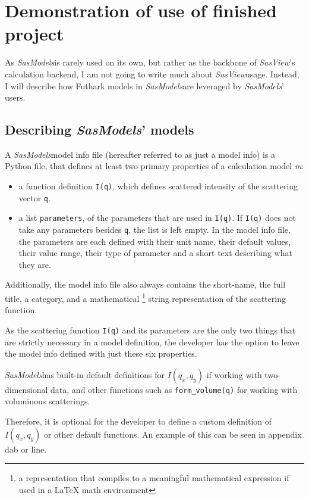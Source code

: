 \documentclass[11pt]{article}
\newcommand{\sasmodels}{\textit{SasModels}}
\newcommand{\sasview}{\textit{SasView}}
\begin{document}
\section{Demonstration of use of finished project}
As \sasmodels is rarely used on its own, but rather as the backbone of 
\sasview's calculation backend, I am not going to write much about 
\sasview usage.
Instead, I will describe how Futhark models in \sasmodels are leveraged 
by \sasmodels' users.


\subsection{Describing \sasmodels' models}
A \sasmodels model info file (hereafter referred to as just a model info) is a 
Python file, that defines at least two primary properties of a 
calculation model \textit{m}:
\begin{itemize}

  \item a function definition \texttt{I(q)}, which defines scattered intensity 
  of the scattering vector \texttt{q}.

  \item a list \texttt{parameters}, of the parameters that are used in 
  \texttt{I(q)}. If \texttt{I(q)} does not take any parameters besides 
  \texttt{q}, the list is left empty.
  In the model info file, the parameters are each defined with their unit name, 
  their default values, their value range, their type of parameter and
  a short text describing what they are.
\end{itemize}

Additionally, the model info file also always contains the short-name, 
the full title, a category, and a mathematical \footnote{a representation 
that compiles to a meaningful mathematical expression if used in a LaTeX math 
environment} string representation of the scattering function.

As the scattering function \texttt{I(q)} and its parameters are the only 
two things that are strictly necessary in a model definition, the developer
has the option to leave the model info defined with just these six properties.

\sasmodels has built-in default definitions for $I(q_x,q_y)$ if working
with two-dimensional data, and other functions such as \texttt{form\_volume(q)}
for working with voluminous scatterings.

Therefore, it is optional for the developer to define a custom definition
of $I(q_x, q_y)$ or other default functions.
An example of this can be seen in appendix dab or line.
\end{document}
